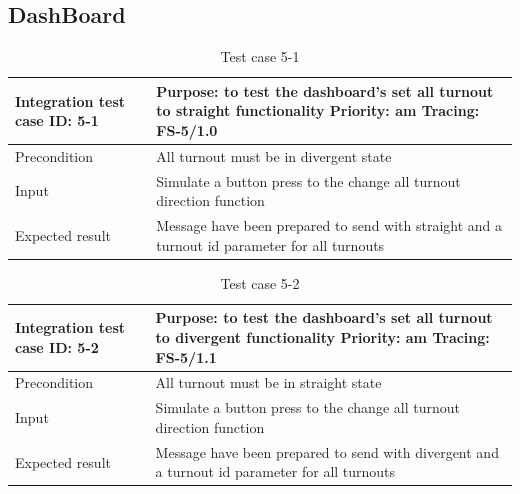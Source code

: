 \subsection{DashBoard}
\begin{table}[H]
	\caption{Test case 5-1}
	\label{table:TCase-FS5-1}
	\begin{center}
		\renewcommand{\arraystretch}{1.8}
		\begin{tabu} 
			to 0.9 \textwidth
			{  X[0.3, l] X[l] }
			\toprule
			Integration test case ID: 5-1 & Purpose: to test the dashboard's set all turnout to straight functionality   \newline Priority: am \newline Tracing: FS-5/1.0 \\ \midrule
			Precondition                  & All turnout must be in divergent state                                                                                        \\
			Input                         & Simulate a button press to the change all turnout direction function                                                          \\
			Expected result               & Message have been prepared to send with straight and a turnout id parameter for all turnouts                                  \\ \bottomrule
		\end{tabu}
	\end{center}
\end{table}

\begin{table}[H]
	\caption{Test case 5-2}
	\label{table:TCase-FS5-2}
	\begin{center}
		\renewcommand{\arraystretch}{1.8}
		\begin{tabu} 
			to 0.9 \textwidth
			{  X[0.3, l] X[l] }
			\toprule
			Integration test case ID: 5-2 & Purpose: to test the dashboard's set all turnout to divergent functionality   \newline Priority: am \newline Tracing: FS-5/1.1 \\ \midrule
			Precondition                  & All turnout must be in straight state                                                                                          \\
			Input                         & Simulate a button press to the change all turnout direction function                                                           \\
			Expected result               & Message have been prepared to send with divergent and a turnout id parameter for all turnouts                                  \\ \bottomrule
		\end{tabu}
	\end{center}
\end{table}

